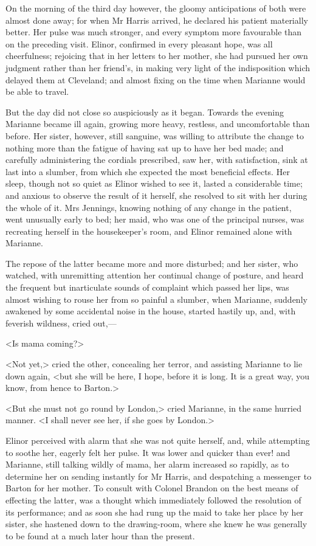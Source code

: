 On the morning of the third day however, the gloomy anticipations of both were almost done away; for when Mr Harris arrived, he declared his patient materially better. Her pulse was much stronger, and every symptom more favourable than on the preceding visit. Elinor, confirmed in every pleasant hope, was all cheerfulness; rejoicing that in her letters to her mother, she had pursued her own judgment rather than her friend's, in making very light of the indisposition which delayed them at Cleveland; and almost fixing on the time when Marianne would be able to travel.

But the day did not close so auspiciously as it began. Towards the evening Marianne became ill again, growing more heavy, restless, and uncomfortable than before. Her sister, however, still sanguine, was willing to attribute the change to nothing more than the fatigue of having sat up to have her bed made; and carefully administering the cordials prescribed, saw her, with satisfaction, sink at last into a slumber, from which she expected the most beneficial effects. Her sleep, though not so quiet as Elinor wished to see it, lasted a considerable time; and anxious to observe the result of it herself, she resolved to sit with her during the whole of it. Mrs Jennings, knowing nothing of any change in the patient, went unusually early to bed; her maid, who was one of the principal nurses, was recreating herself in the housekeeper's room, and Elinor remained alone with Marianne.

The repose of the latter became more and more disturbed; and her sister, who watched, with unremitting attention her continual change of posture, and heard the frequent but inarticulate sounds of complaint which passed her lips, was almost wishing to rouse her from so painful a slumber, when Marianne, suddenly awakened by some accidental noise in the house, started hastily up, and, with feverish wildness, cried out,—

<Is mama coming?>

<Not yet,> cried the other, concealing her terror, and assisting Marianne to lie down again, <but she will be here, I hope, before it is long. It is a great way, you know, from hence to Barton.>

<But she must not go round by London,> cried Marianne, in the same hurried manner. <I shall never see her, if she goes by London.>

Elinor perceived with alarm that she was not quite herself, and, while attempting to soothe her, eagerly felt her pulse. It was lower and quicker than ever! and Marianne, still talking wildly of mama, her alarm increased so rapidly, as to determine her on sending instantly for Mr Harris, and despatching a messenger to Barton for her mother. To consult with Colonel Brandon on the best means of effecting the latter, was a thought which immediately followed the resolution of its performance; and as soon she had rung up the maid to take her place by her sister, she hastened down to the drawing-room, where she knew he was generally to be found at a much later hour than the present.

